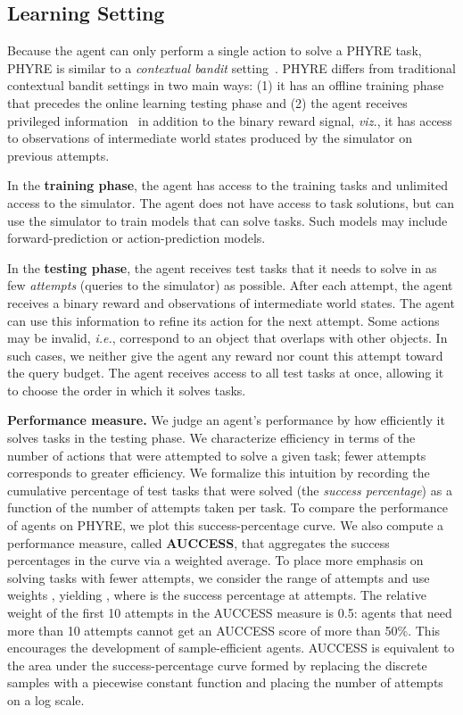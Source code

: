 \documentclass{article}
\begin{document}
\subsection{Learning Setting}
\label{sec:learning_setting}
Because the agent can only perform a single action to solve a PHYRE task, PHYRE is similar to a \emph{contextual bandit} setting~\cite{langford2008bandits,li2010contextual}. PHYRE differs from traditional contextual bandit settings in two main ways: (1) it has an offline training phase that precedes the online learning testing phase and (2) the agent receives privileged information~\cite{vapnik2009privileged} in addition to the binary reward signal, \emph{viz.}, it has access to observations of intermediate world states produced by the simulator on previous attempts.

In the \textbf{training phase}, the agent has access to the training tasks and unlimited access to the simulator. The agent does not have access to task solutions, but can use the simulator to train models that can solve tasks. Such models may include forward-prediction or action-prediction models.

In the \textbf{testing phase}, the agent receives test tasks that it needs to solve in as few \emph{attempts} (queries to the simulator) as possible. After each attempt, the agent receives a binary reward and observations of intermediate world states. The agent can use this information to refine its action for the next attempt. Some actions may be invalid, \emph{i.e.}, correspond to an object that overlaps with other objects. In such cases, we neither give the agent any reward nor count this attempt toward the query budget. The agent receives access to all test tasks at once, allowing it to choose the order in which it solves tasks.

\noindent\textbf{Performance measure.}
We judge an agent's performance by how efficiently it solves tasks in the testing phase. We characterize efficiency in terms of the number of actions that were attempted to solve a given task; fewer attempts corresponds to greater efficiency. We formalize this intuition by recording the cumulative percentage of test tasks that were solved (the \emph{success percentage}) as a function of the number of attempts taken per task. To compare the performance of agents on PHYRE, we plot this success-percentage curve. We also compute a performance measure, called \textbf{AUCCESS}, that aggregates the success percentages in the curve via a weighted average. To place more emphasis on solving tasks with fewer attempts, we consider the range of attempts  and use weights , yielding , where  is the success percentage at  attempts. The relative weight of the first 10 attempts in the AUCCESS measure is 0.5: agents that need more than 10 attempts cannot get an AUCCESS score of more than 50\%. This encourages the development of sample-efficient agents. AUCCESS is equivalent to the area under the success-percentage curve formed by replacing the discrete samples with a piecewise constant function and placing the number of attempts on a log scale.
\end{document}

